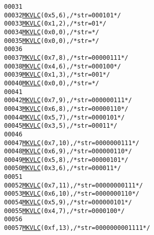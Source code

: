 \begin{footnotesize}
\begin{alltt}
00031 
00032         \hyperlink{vlc_8h_aa680b26539d09b5954221ff39a127faa}{MKVLC}( 0x5, 6 ), \textcolor{comment}{/* str=000101 */}
00033         \hyperlink{vlc_8h_aa680b26539d09b5954221ff39a127faa}{MKVLC}( 0x1, 2 ), \textcolor{comment}{/* str=01 */}
00034         \hyperlink{vlc_8h_aa680b26539d09b5954221ff39a127faa}{MKVLC}( 0x0, 0 ), \textcolor{comment}{/* str= */}
00035         \hyperlink{vlc_8h_aa680b26539d09b5954221ff39a127faa}{MKVLC}( 0x0, 0 ), \textcolor{comment}{/* str= */}
00036 
00037         \hyperlink{vlc_8h_aa680b26539d09b5954221ff39a127faa}{MKVLC}( 0x7, 8 ), \textcolor{comment}{/* str=00000111 */}
00038         \hyperlink{vlc_8h_aa680b26539d09b5954221ff39a127faa}{MKVLC}( 0x4, 6 ), \textcolor{comment}{/* str=000100 */}
00039         \hyperlink{vlc_8h_aa680b26539d09b5954221ff39a127faa}{MKVLC}( 0x1, 3 ), \textcolor{comment}{/* str=001 */}
00040         \hyperlink{vlc_8h_aa680b26539d09b5954221ff39a127faa}{MKVLC}( 0x0, 0 ), \textcolor{comment}{/* str= */}
00041 
00042         \hyperlink{vlc_8h_aa680b26539d09b5954221ff39a127faa}{MKVLC}( 0x7, 9 ), \textcolor{comment}{/* str=000000111 */}
00043         \hyperlink{vlc_8h_aa680b26539d09b5954221ff39a127faa}{MKVLC}( 0x6, 8 ), \textcolor{comment}{/* str=00000110 */}
00044         \hyperlink{vlc_8h_aa680b26539d09b5954221ff39a127faa}{MKVLC}( 0x5, 7 ), \textcolor{comment}{/* str=0000101 */}
00045         \hyperlink{vlc_8h_aa680b26539d09b5954221ff39a127faa}{MKVLC}( 0x3, 5 ), \textcolor{comment}{/* str=00011 */}
00046 
00047         \hyperlink{vlc_8h_aa680b26539d09b5954221ff39a127faa}{MKVLC}( 0x7, 10 ), \textcolor{comment}{/* str=0000000111 */}
00048         \hyperlink{vlc_8h_aa680b26539d09b5954221ff39a127faa}{MKVLC}( 0x6, 9 ), \textcolor{comment}{/* str=000000110 */}
00049         \hyperlink{vlc_8h_aa680b26539d09b5954221ff39a127faa}{MKVLC}( 0x5, 8 ), \textcolor{comment}{/* str=00000101 */}
00050         \hyperlink{vlc_8h_aa680b26539d09b5954221ff39a127faa}{MKVLC}( 0x3, 6 ), \textcolor{comment}{/* str=000011 */}
00051 
00052         \hyperlink{vlc_8h_aa680b26539d09b5954221ff39a127faa}{MKVLC}( 0x7, 11 ), \textcolor{comment}{/* str=00000000111 */}
00053         \hyperlink{vlc_8h_aa680b26539d09b5954221ff39a127faa}{MKVLC}( 0x6, 10 ), \textcolor{comment}{/* str=0000000110 */}
00054         \hyperlink{vlc_8h_aa680b26539d09b5954221ff39a127faa}{MKVLC}( 0x5, 9 ), \textcolor{comment}{/* str=000000101 */}
00055         \hyperlink{vlc_8h_aa680b26539d09b5954221ff39a127faa}{MKVLC}( 0x4, 7 ), \textcolor{comment}{/* str=0000100 */}
00056 
00057         \hyperlink{vlc_8h_aa680b26539d09b5954221ff39a127faa}{MKVLC}( 0xf, 13 ), \textcolor{comment}{/* str=0000000001111 */}

\end{alltt}
\end{footnotesize}

